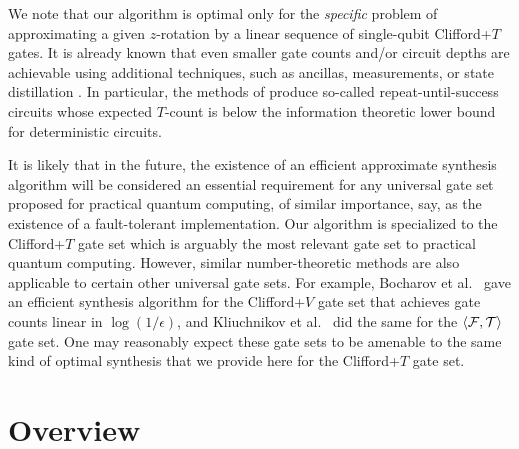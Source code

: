 \documentclass{article}
\begin{document}
We note that our algorithm is optimal only for the {\em specific}
problem of approximating a given $z$-rotation by a linear sequence of
single-qubit Clifford+$T$ gates. It is already known that even smaller
gate counts and/or circuit depths are achievable using additional
techniques, such as ancillas, measurements, or state distillation
{\cite{DCS12, WK13, BRS2015-1, BRS2015-2}}. In particular, the methods
of \cite{BRS2015-1} produce so-called repeat-until-success circuits
whose expected $T$-count is below the information theoretic lower
bound for deterministic circuits.

It is likely that in the future, the existence of an efficient
approximate synthesis algorithm will be considered an essential
requirement for any universal gate set proposed for practical quantum
computing, of similar importance, say, as the existence of a
fault-tolerant implementation. Our algorithm is specialized to the
Clifford+$T$ gate set which is arguably the most relevant gate set to
practical quantum computing. However, similar number-theoretic methods
are also applicable to certain other universal gate sets. For example,
Bocharov et al.\ {\cite{BGS2013}} gave an efficient synthesis
algorithm for the Clifford+$V$ gate set that achieves gate counts
linear in $\log(1/\epsilon)$, and Kliuchnikov et al.\ {\cite{KBS2013}}
did the same for the $\langle{\cal F}, {\cal T}\rangle$ gate set. One may
reasonably expect these gate sets to be amenable to the same kind of
optimal synthesis that we provide here for the Clifford+$T$ gate set.

\section{Overview}
\end{document}
